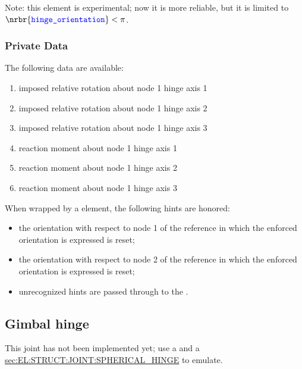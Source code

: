 Note: this element is experimental; now it is more reliable, 
but it is limited to $\nrbr{\nt{hinge\_orientation}} < \pi$.

\subsubsection{Private Data}
The following data are available:
\begin{enumerate}
\item {} imposed relative rotation about node 1 hinge axis 1
\item {} imposed relative rotation about node 1 hinge axis 2
\item {} imposed relative rotation about node 1 hinge axis 3
\item {} reaction moment about node 1 hinge axis 1
\item {} reaction moment about node 1 hinge axis 2
\item {} reaction moment about node 1 hinge axis 3
\end{enumerate}
When wrapped by a  element, the following hints are honored:
\begin{itemize}
\item {} the orientation with respect to node 1
of the reference in which the enforced orientation is expressed is reset;
\item {} the orientation with respect to node 2
of the reference in which the enforced orientation is expressed is reset;
\item unrecognized hints are passed through to the .
\end{itemize}

\subsection{Gimbal hinge}
This joint has not been implemented yet; use a 
and a
\hyperref{\kw{spherical hinge}}{\kw{spherical hinge} (see Section~}{)}{sec:EL:STRUCT:JOINT:SPHERICAL_HINGE}
to emulate.

